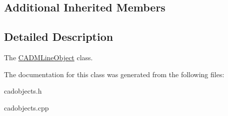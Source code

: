 \subsection*{Additional Inherited Members}


\subsection{Detailed Description}
The \hyperlink{class_c_a_d_m_line_object}{C\+A\+D\+M\+Line\+Object} class. 

The documentation for this class was generated from the following files\+:\begin{DoxyCompactItemize}
\item 
cadobjects.\+h\item 
cadobjects.\+cpp\end{DoxyCompactItemize}
